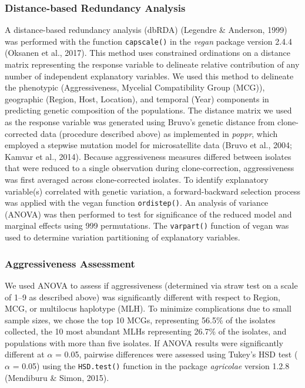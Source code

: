 \documentclass[fleqn,10pt,lineno]{wlpeerj} %
\theoremstyle{definition}
\theoremstyle{definition}
\theoremstyle{definition}
\theoremstyle{remark}
\begin{document}
\subsubsection*{Distance-based Redundancy
Analysis}\label{distance-based-redundancy-analysis}

A distance-based redundancy analysis (dbRDA) (Legendre \& Anderson,
1999) was performed with the function \texttt{capscale()} in the
\emph{vegan} package version 2.4.4 (Oksanen et al., 2017). This method
uses constrained ordinations on a distance matrix representing the
response variable to delineate relative contribution of any number of
independent explanatory variables. We used this method to delineate the
phenotypic (Aggressiveness, Mycelial Compatibility Group (MCG)),
geographic (Region, Host, Location), and temporal (Year) components in
predicting genetic composition of the populations. The distance matrix
we used as the response variable was generated using Bruvo's genetic
distance from clone-corrected data (procedure described above) as
implemented in \emph{poppr}, which employed a stepwise mutation model
for microsatellite data (Bruvo et al., 2004; Kamvar et al., 2014).
Because aggressiveness measures differed between isolates that were
reduced to a single observation during clone-correction, aggressiveness
was first averaged across clone-corrected isolates. To identify
explanatory variable(s) correlated with genetic variation, a
forward-backward selection process was applied with the vegan function
\texttt{ordistep()}. An analysis of variance (ANOVA) was then performed
to test for significance of the reduced model and marginal effects using
999 permutations. The \texttt{varpart()} function of vegan was used to
determine variation partitioning of explanatory variables.

\subsubsection*{Aggressiveness
Assessment}\label{aggressiveness-assessment}

We used ANOVA to assess if aggressiveness (determined via straw test on
a scale of 1--9 as described above) was significantly different with
respect to Region, MCG, or multilocus haplotype (MLH). To minimize
complications due to small sample sizes, we chose the top 10 MCGs,
representing 56.5\% of the isolates collected, the 10 most abundant MLHs
representing 26.7\% of the isolates, and populations with more than five
isolates. If ANOVA results were significantly different at \(\alpha\) =
0.05, pairwise differences were assessed using Tukey's HSD test
(\(\alpha\) = 0.05) using the \texttt{HSD.test()} function in the
package \emph{agricolae} version 1.2.8 (Mendiburu \& Simon, 2015).
\end{document}
